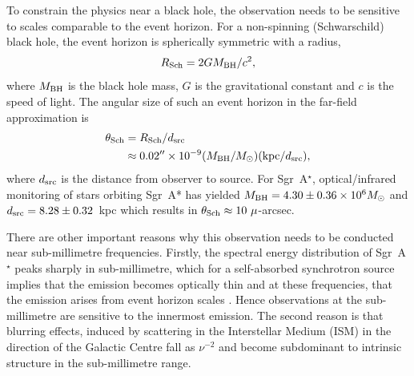 To constrain the physics near a black hole, the observation needs to be sensitive to scales comparable to the event horizon. For a non-spinning (Schwarschild) black hole, the event horizon is spherically symmetric with a radius, 
\begin{equation}
R_{\rm Sch} = 2 G M_{\rm BH} /c^2,
\end{equation}
where $M_{\rm BH}$ is the black hole mass, $G$ is the gravitational constant and $c$ is the speed of light. The angular size of such an event horizon in the far-field approximation is
\begin{align}
\theta_{\rm Sch} &= R_{\rm Sch} / d_{\rm src}\\
&\approx 0.02^{\prime \prime} \times 10^{-9} (M_{\rm BH}/M_\odot)({\rm kpc}/d_{\rm src}),
\end{align}
where $d_{\rm src}$ is the distance from observer to source. For Sgr~A$^\star$, optical/infrared monitoring of stars orbiting Sgr~A* \citep{Gillessen_2009} has yielded ${M_{\rm BH} = 4.30 \pm 0.36 \times 10^{6} M_\odot}$ and ${d_{\rm src}= 8.28 \pm 0.32}$~kpc which results in ${\theta_{\rm Sch} \approx 10\ \mu}$-arcsec. 

There are other important reasons why this observation needs to be conducted near sub-millimetre frequencies. Firstly, the spectral energy distribution of Sgr~A$^\star$ peaks sharply in sub-millimetre, which for a self-absorbed synchrotron source  implies that the emission becomes optically thin and at these frequencies, that the emission arises from event horizon scales \citep{Serabyn_1997,Falcke_1998}. Hence observations at the sub-millimetre are sensitive to the innermost emission.
The second reason is that blurring effects, induced by scattering in the Interstellar Medium (ISM) in the direction of the Galactic Centre \citep[e.g.][]{Fish_2014} fall as $\nu^{-2}$ and become subdominant to intrinsic structure in the sub-millimetre range.



